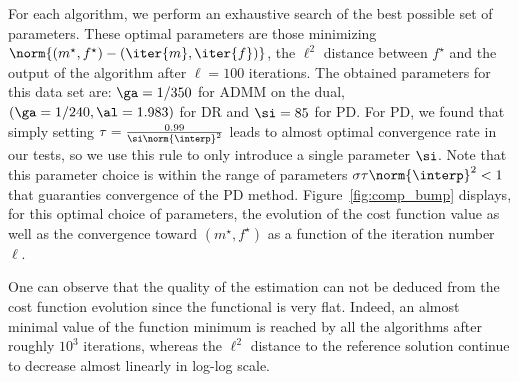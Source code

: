 For each algorithm, we perform an exhaustive search of the best possible set of parameters. These optimal parameters are those minimizing $\norm{(m^\star,f^\star) - (\iter{m},\iter{f})}$, the $\ell^2$ distance between $f^\star$ and the output of the algorithm after $\ell=100$ iterations. The obtained  parameters for this data set are:  $\ga=1/350$ for ADMM on the dual, $(\ga=1/240,\al=1.983)$ for DR and $\si=85$ for PD. For PD, we found that simply setting $\tau=\frac{0.99}{\si \norm{\interp}^2}$ leads to almost optimal convergence rate in our tests, so we use this rule to only introduce a single parameter $\si$. Note that this parameter choice is within the range of parameters $\sigma \tau \norm{\interp}^2<1$ that guaranties convergence of the PD method. Figure~\ref{fig:comp_bump} displays, for this optimal choice of parameters, the evolution of the cost function value as well as the  convergence toward $(m^\star,f^\star)$ as a function of the iteration number $\ell$. 

One can observe that the quality of the estimation can not be deduced from the cost function evolution since the functional is very flat. Indeed, an almost minimal value of the function minimum is reached by all the algorithms after roughly $10^3$ iterations, whereas the $\ell^2$ distance to the reference solution continue to decrease almost linearly in log-log scale.

